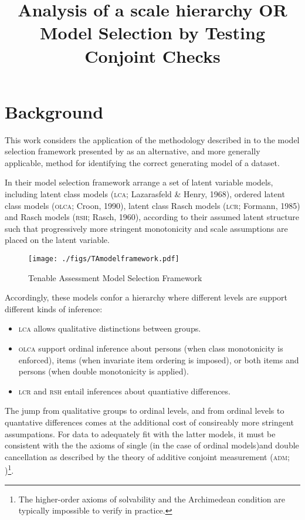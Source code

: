 \documentclass[12pt]{article}
\title{Analysis of a scale hierarchy OR Model Selection by Testing Conjoint Checks}
\date{}
\begin{document}
\maketitle
\onehalfspacing
\section{Background}
This work considers the application of the methodology described in  to the model selection framework presented by  as an alternative, and more generally applicable, method for identifying the correct generating model of a dataset.

In their model selection framework  arrange a set of latent variable models, including latent class models (\textsc{lca}; Lazarasfeld & Henry, 1968), ordered latent class models (\textsc{olca}; Croon, 1990), latent class Rasch models (\textsc{lcr}; Formann, 1985) and Rasch models (\textsc{rsh}; Rasch, 1960), according to their assumed latent structure such that progressively more stringent monotonicity and scale assumptions are placed on the latent variable. 

\begin{figure}
\centering
\caption{Tenable Assessment Model Selection Framework} \label{orig}
\texttt{[image: ./figs/TAmodelframework.pdf]}
\end{figure}

Accordingly, these models confor a hierarchy where different levels are support different kinds of inference:

\begin{itemize}
	\item \textsc{lca} allows qualitative distinctions between groups.
	\item \textsc{olca} support ordinal inference about persons (when class monotonicity is enforced), items (when invariate item ordering is imposed), or both items and persons (when double monotonicity is applied).
	\item \textsc{lcr} and \textsc{rsh} entail inferences about quantiative differences.
\end{itemize}

The jump from qualitative groups to ordinal levels, and from ordinal levels to quantative differences comes at the additional cost of consireably more stringent assumpations. For data to adequately fit with the latter models, it must be consistent with the the axioms of single (in the case of ordinal models)and double cancellation as described by the theory of additive conjoint measurement (\textsc{adm}; )\footnote{The higher-order axioms of solvability and the Archimedean condition are typically impossible to verify in practice.}.
\end{document}
